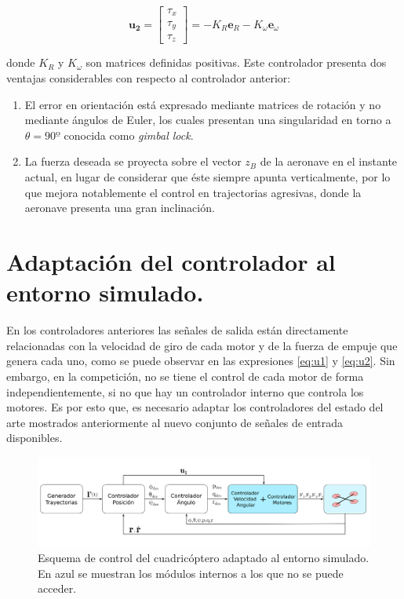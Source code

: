 \begin{equation}
	\label{eq:u2_non_linearized}\mathbf{u_2}=
\begin{bmatrix}
	\tau_x\\\tau_y\\\tau_z 
\end{bmatrix}= -K_R	\mathbf{e}_R - K_\omega	\mathbf{e}_\omega
\end{equation}

donde $K_R$ y $K_\omega$ son matrices definidas positivas. Este controlador presenta dos ventajas considerables con respecto al controlador anterior:
\begin{enumerate}
	\item El error en orientación está expresado mediante matrices de rotación y no mediante ángulos de Euler, los cuales presentan una singularidad en torno a $\theta = 90º$ conocida como \textit{gimbal lock}.
	\item La fuerza deseada se proyecta sobre el vector $z_B$ de la aeronave en el instante actual, en lugar de considerar que éste siempre apunta verticalmente, por lo que mejora notablemente el control en trajectorias agresivas, donde la aeronave presenta una gran inclinación.
\end{enumerate}


\section{Adaptación del controlador al entorno simulado.}

En los controladores anteriores las señales de salida están directamente relacionadas con la velocidad de giro de cada motor y de la fuerza de empuje que genera cada uno, como se puede observar en las expresiones \ref{eq:u1} y \ref{eq:u2}. Sin embargo, en la competición, no se tiene el control de cada motor de forma independientemente, si no que hay un controlador interno que controla los motores. Es por esto que, es necesario adaptar los controladores del estado del arte mostrados anteriormente al nuevo conjunto de señales de entrada disponibles.

\begin{figure}[htb!]
	\centering
	\includegraphics[width=\textwidth]{imagenes/diagramaControl2}
	\caption{Esquema de control del cuadricóptero adaptado al entorno simulado. En azul se muestran los módulos internos a los que no se puede acceder. }
	\label{control:2}
\end{figure}



